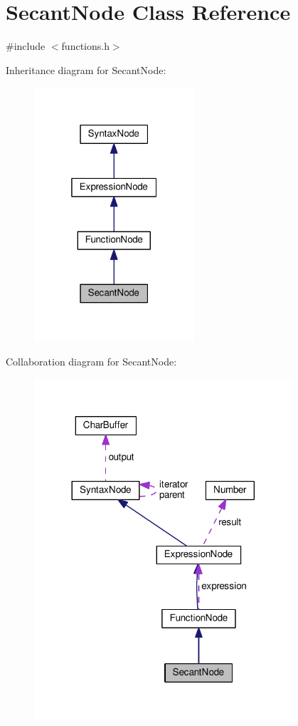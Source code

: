 \hypertarget{classSecantNode}{}\section{Secant\+Node Class Reference}
\label{classSecantNode}


{\ttfamily \#include $<$functions.\+h$>$}



Inheritance diagram for Secant\+Node\+:
\nopagebreak
\begin{figure}[H]
\begin{center}
\leavevmode
\includegraphics[width=169pt]{d9/d36/classSecantNode__inherit__graph}
\end{center}
\end{figure}


Collaboration diagram for Secant\+Node\+:
\nopagebreak
\begin{figure}[H]
\begin{center}
\leavevmode
\includegraphics[width=272pt]{df/d0f/classSecantNode__coll__graph}
\end{center}
\end{figure}
